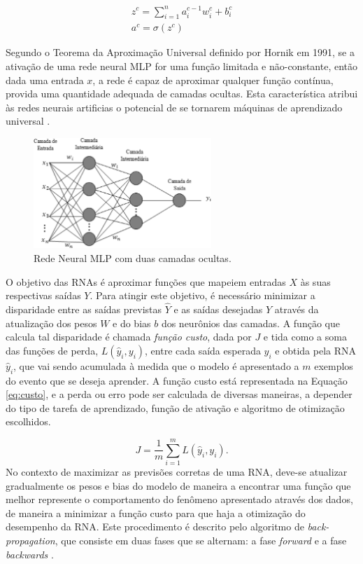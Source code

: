 \begin{gather}\label{eq:funcao_neuronio_camadas}
	z^c = \sum_{i=1}^n a_i^{c-1} w_i^c + b_i^c\\
	a^c = \sigma(z^c)
\end{gather}

Segundo o Teorema da Aproximação Universal definido por Hornik em 1991, se a ativação de uma rede neural MLP for uma função limitada e não-constante, então dada uma entrada $x$, a rede é capaz de aproximar qualquer função contínua, provida uma quantidade adequada de camadas ocultas. Esta característica atribui às redes neurais artificias o potencial de se tornarem máquinas de aprendizado universal \cite{hornik1991approximation}.

\begin{figure}[ht]
	\centering
	\caption{Rede Neural MLP com duas camadas ocultas.}
	\label{fig:mlp}
	\includegraphics[width=0.6\textwidth]{img/mlprna.jpg}
\end{figure}

O objetivo das RNAs é aproximar funções que mapeiem entradas $X$ às suas respectivas saídas $Y$. Para atingir este objetivo, é necessário minimizar a disparidade entre as saídas previstas $\hat{Y}$ e as saídas desejadas $Y$ através da atualização dos pesos $W$ e do bias $b$ dos neurônios das camadas. A função que calcula tal disparidade é chamada \emph{função custo}, dada por $J$ e tida como a soma das funções de perda, $L(\hat{y}_i, y_i)$, entre cada saída esperada $y_i$ e obtida pela RNA $\hat{y}_i$, que vai sendo acumulada à medida que o modelo é apresentado a $m$ exemplos do evento que se deseja aprender. A função custo está representada na Equação \ref{eq:custo}, e a perda ou erro pode ser calculada de diversas maneiras, a depender do tipo de tarefa de aprendizado, função de ativação e algoritmo de otimização escolhidos.

\begin{equation}\label{eq:custo}
J = \frac{1}{m} \sum_{i=1}^{m} L(\hat{y}_{i}, y_{i}).
\end{equation} No contexto de maximizar as previsões corretas de uma RNA, deve-se atualizar gradualmente os pesos e bias do modelo de maneira a encontrar uma função que melhor represente o comportamento do fenômeno apresentado através dos dados, de maneira a minimizar a função custo para que haja a otimização do desempenho da RNA. Este procedimento é descrito pelo algoritmo de \emph{back-propagation}, que consiste em duas fases que se alternam: a fase \emph{forward} e a fase \emph{backwards} \cite{haykin2009neural}.

